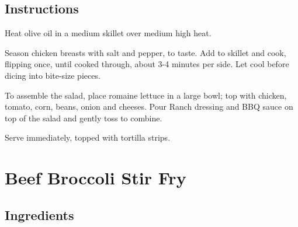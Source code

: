 \documentclass[letterpaper,10pt,english]{sphinxmanual}
\begin{document}
\section{Instructions}
\label{\detokenize{BBQ_Cluck_Salad:instructions}}
Heat olive oil in a medium skillet over medium high heat.

Season chicken breasts with salt and pepper, to taste. Add to skillet and cook, flipping once, until cooked through, about 3-4 minutes per side. Let cool before dicing into bite-size pieces.

To assemble the salad, place romaine lettuce in a large bowl; top with chicken, tomato, corn, beans, onion and cheeses. Pour Ranch dressing and BBQ sauce on top of the salad and gently toss to combine.

Serve immediately, topped with tortilla strips.


\chapter{Beef Broccoli Stir Fry}
\label{\detokenize{Beef_Broc:beef-broccoli-stir-fry}}\label{\detokenize{Beef_Broc::doc}}

\section{Ingredients}
\label{\detokenize{Beef_Broc:ingredients}}
%
\begin{sphinxVerbatim}[commandchars=\\\{\}]
   

    

     

   

  

    

   

   

     

    

    
\end{sphinxVerbatim}
\end{document}
